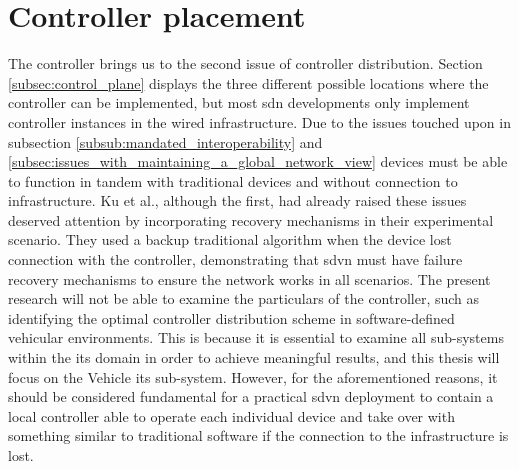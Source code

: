 \section{Controller placement}
The controller brings us to the second issue of controller distribution. Section \ref{subsec:control_plane} displays the three different possible locations where the controller can be implemented, but most \gls{sdn} developments only implement controller instances in the wired infrastructure. Due to the issues touched upon in subsection \ref{subsub:mandated_interoperability} and \ref{subsec:issues_with_maintaining_a_global_network_view} devices must be able to function in tandem with traditional devices and without connection to infrastructure. 
Ku et al.\cite{ku_towards_2014}, although the first, had already raised these issues deserved attention by incorporating recovery mechanisms in their experimental scenario. They used a backup traditional algorithm when the device lost connection with the controller, demonstrating that \gls{sdvn} must have failure recovery mechanisms to ensure the network works in all scenarios.
The present research will not be able to examine the particulars of the controller, such as identifying the optimal controller distribution scheme in software-defined vehicular environments. This is because it is essential to examine all sub-systems within the \gls{its} domain in order to achieve meaningful results, and this thesis will focus on the Vehicle \gls{its} sub-system.
However, for the aforementioned reasons, it should be considered fundamental for a practical \gls{sdvn} deployment to contain a local controller able to operate each individual device and take over with something similar to traditional software if the connection to the infrastructure is lost. 
    